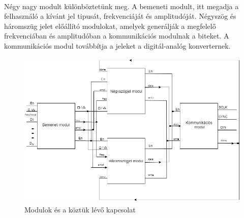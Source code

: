 \documentclass[12pt]{article}
\begin{document}
  \paragraph{}
  Négy nagy modult különböztetünk meg. A bemeneti modult, itt megadja a felhasználó a kívánt jel tipusát, frekvenciáját és amplitudóját.
  Négyszög és háromszüg jelet előállító modulokat, amelyek generálják a megfelelő frekvenciában és amplitudóban a kommunikációs modulnak a biteket.
  A kommunikációs modul továbbítja a jeleket a digitál-analóg konverternek.
      \begin{figure}[hb]
        \includegraphics[width=\textwidth]{modulok}
        \centering  
        \caption{Modulok és a köztük lévő kapcsolat}
      \end{figure}

      
      
\end{document}
